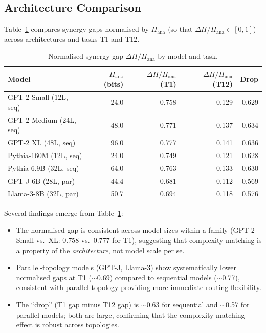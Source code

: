 \documentclass{article}
\newcommand{\Hana}{H_{\mathrm{ana}}}
\newcommand{\DeltaH}{\Delta H}
\begin{document}
\subsection{Architecture Comparison}

Table~\ref{tab:arch} compares synergy gaps normalised by $\Hana$ (so that
$\DeltaH / \Hana \in [0,1]$) across architectures and tasks T1 and T12.

\begin{table}[h]
  \centering
  \caption{Normalised synergy gap $\DeltaH / \Hana$ by model and task.}
  \label{tab:arch}
  \begin{tabular}{lrrrr}
    \toprule
    Model & $\Hana$ (bits) & $\DeltaH/\Hana$ (T1) & $\DeltaH/\Hana$ (T12) & Drop \\
    \midrule
    GPT-2 Small (12L, seq)   & 24.0 & 0.758 & 0.129 & 0.629 \\
    GPT-2 Medium (24L, seq)  & 48.0 & 0.771 & 0.137 & 0.634 \\
    GPT-2 XL (48L, seq)      & 96.0 & 0.777 & 0.141 & 0.636 \\
    Pythia-160M (12L, seq)   & 24.0 & 0.749 & 0.121 & 0.628 \\
    Pythia-6.9B (32L, seq)   & 64.0 & 0.763 & 0.133 & 0.630 \\
    GPT-J-6B (28L, par)      & 44.4 & 0.681 & 0.112 & 0.569 \\
    Llama-3-8B (32L, par)    & 50.7 & 0.694 & 0.118 & 0.576 \\
    \bottomrule
  \end{tabular}
\end{table}

Several findings emerge from Table~\ref{tab:arch}:
\begin{itemize}
  \item The normalised gap is consistent across model sizes within a family
        (GPT-2 Small vs.\ XL: 0.758 vs.\ 0.777 for T1), suggesting that
        complexity-matching is a property of the \emph{architecture}, not
        model scale per se.
  \item Parallel-topology models (GPT-J, Llama-3) show systematically lower
        normalised gaps at T1 ($\sim$0.69) compared to sequential models ($\sim$0.77),
        consistent with parallel topology providing more immediate routing flexibility.
  \item The ``drop'' (T1 gap minus T12 gap) is $\sim$0.63 for sequential and
        $\sim$0.57 for parallel models; both are large, confirming that the
        complexity-matching effect is robust across topologies.
\end{itemize}
\end{document}
